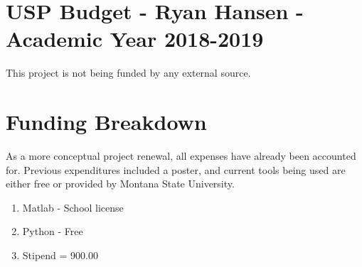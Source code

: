 \documentclass[12pt]{article}
\begin{document}
	
	\section*{USP Budget - Ryan Hansen - Academic Year 2018-2019}
	This project is not being funded by any external source. \\
	\section*{Funding Breakdown}
	As a more conceptual project renewal, all expenses have already been accounted for. Previous expenditures included a poster, and current tools being used are either free or provided by Montana State University.
	\begin{enumerate}
		\item Matlab - School license
		\item Python - Free
		\item Stipend = 900.00
	\end{enumerate}
	 
	
\end{document}
